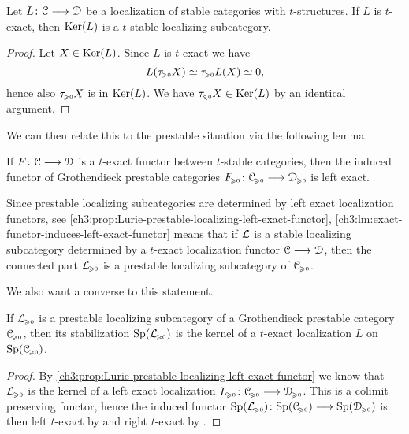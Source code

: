 \begin{lemma}
    \label{ch3:lm:t-exact-then-t-stable-kernel}
    Let $L\:\C\to\D$ be a localization of stable categories with $t$-structures. If $L$ is $t$-exact, then $\Ker(L)$ is a $t$-stable localizing subcategory.  
\end{lemma}
\begin{proof}
    Let $X\in \Ker(L)$. Since $L$ is $t$-exact we have 
    \[L(\tau\geqz X)\simeq \tau\geqz L(X)\simeq 0,\] 
    hence also $\tau\geqz X$ is in $\Ker(L)$. We have $\tau\leqz X\in \Ker(L)$ by an identical argument.  
\end{proof}

We can then relate this to the prestable situation via the following lemma. 

\begin{lemma}
    \label{ch3:lm:exact-functor-induces-left-exact-functor}
    If $F\:\C\to \D$ is a $t$-exact functor between $t$-stable categories, then the induced functor of Grothendieck prestable categories $F\geqz\:\C\geqz\to\D\geqz$ is left exact. 
\end{lemma}

\begin{remark}
    \label{ch3:rm:kernel-of-t-exact-then-prestable-localizing}
    Since prestable localizing subcategories are determined by left exact localization functors, see \cref{ch3:prop:Lurie-prestable-localizing-left-exact-functor}, \cref{ch3:lm:exact-functor-induces-left-exact-functor} means that if $\L$ is a stable localizing subcategory determined by a $t$-exact localization functor $\C\to \D$, then the connected part $\L\geqz$ is a prestable localizing subcategory of $\C\geqz$. 
\end{remark}

We also want a converse to this statement.

\begin{lemma}
    \label{ch3:lm:prestable-localizing-then-kernel-of-t-exact}
    If $\L\geqz$ is a prestable localizing subcategory of a Grothendieck prestable category $\C\geqz$, then its stabilization $\Sp(\L\geqz)$ is the kernel of a $t$-exact localization $L$ on $\Sp(\C\geqz)$.  
\end{lemma}
\begin{proof}
    By \cref{ch3:prop:Lurie-prestable-localizing-left-exact-functor} we know that $\L\geqz$ is the kernel of a left exact localization $L\geqz \: \C\geqz \to \D\geqz$. This is a colimit preserving functor, hence the induced functor $\Sp(\L\geqz)\:\Sp(\C\geqz)\to \Sp(\D\geqz)$ is then left $t$-exact by \cite[C.3.2.1]{lurie_SAG} and right $t$-exact by \cite[C.3.1.1]{lurie_SAG}. 
\end{proof}

